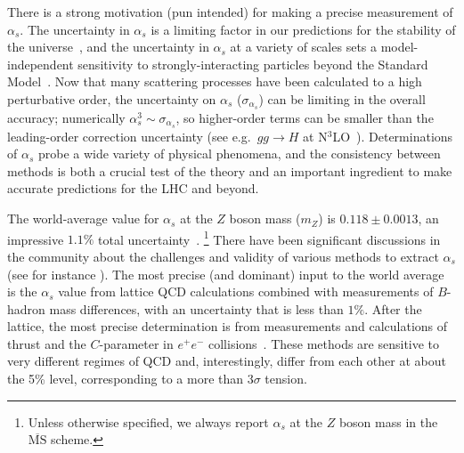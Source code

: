 \documentclass[11pt]{cernrep}
\begin{document}
There is a strong motivation (pun intended) for making a precise measurement of $\alpha_s$.
%
The uncertainty in $\alpha_s$ is a limiting factor in our predictions for the stability of the universe~\cite{Andreassen:2017rzq}, and the
uncertainty in $\alpha_s$ at a variety of scales sets a model-independent sensitivity to strongly-interacting particles beyond the Standard Model~\cite{Kaplan:2008pt,Becciolini:2014lya}.
%
Now that many scattering processes have been calculated to a high perturbative order, the uncertainty on $\alpha_s$ ($\sigma_{\alpha_s}$) can be limiting in the overall accuracy; numerically $\alpha_s^3\sim \sigma_{\alpha_s}$, so higher-order terms can be smaller than the leading-order correction uncertainty (see e.g.\ $gg\rightarrow H$ at N$^3$LO~\cite{Anastasiou:2015ema}).
%
Determinations of $\alpha_s$ probe a wide variety of physical phenomena, and the consistency between methods is both a crucial test of the theory and an important ingredient to make accurate predictions for the LHC and beyond.

The world-average value for $\alpha_s$ at the $Z$ boson mass ($m_Z$) is $0.118\pm 0.0013$, an impressive $1.1\%$ total uncertainty~\cite{Olive:2016xmw}.%
\footnote{Unless otherwise specified, we always report $\alpha_s$ at the $Z$ boson mass in the $\overline{\mathrm{MS}}$ scheme.} 
%
There have been significant discussions in the community about the challenges and validity of various methods to extract $\alpha_s$ (see for instance \cite{Bethke:2011tr,Altarelli:2013bpa,Pich:2013sqa,Moch:2014tta,dEnterria:2015kmd,Olive:2016xmw,Salam:2017qdl}).
%
The most precise (and dominant) input to the world average is the $\alpha_s$ value from lattice QCD calculations combined with measurements of $B$-hadron mass differences, with an uncertainty that is less than $1\%$. 
%
After the lattice, the most precise determination is from measurements and calculations of thrust and the $C$-parameter in $e^+e^-$ collisions~\cite{Abbate:2010xh,Hoang:2015hka,Heister:2003aj,Abdallah:2004xe,Abreu:1996mk,Abreu:1999rc,Biebel:1999zt,Adeva:1992gv,Abbiendi:2004qz,Abe:1994mf}.
%
These methods are sensitive to very different regimes of QCD and, interestingly, differ from each other at about the 5\% level, corresponding to a more than $3\sigma$ tension.  
\end{document}
